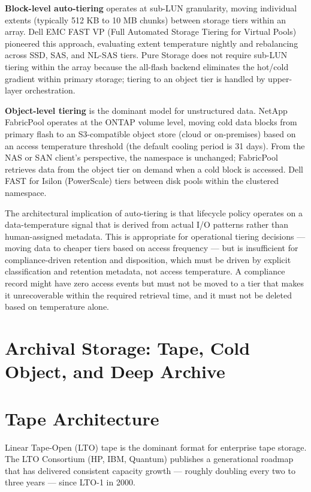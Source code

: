 \textbf{Block-level auto-tiering} operates at sub-LUN granularity, moving individual extents (typically 512 KB to 10 MB chunks) between storage tiers within an array. Dell EMC FAST VP (Full Automated Storage Tiering for Virtual Pools) pioneered this approach, evaluating extent temperature nightly and rebalancing across SSD, SAS, and NL-SAS tiers. Pure Storage does not require sub-LUN tiering within the array because the all-flash backend eliminates the hot/cold gradient within primary storage; tiering to an object tier is handled by upper-layer orchestration.

\textbf{Object-level tiering} is the dominant model for unstructured data. NetApp FabricPool operates at the ONTAP volume level, moving cold data blocks from primary flash to an S3-compatible object store (cloud or on-premises) based on an access temperature threshold (the default cooling period is 31 days). From the NAS or SAN client's perspective, the namespace is unchanged; FabricPool retrieves data from the object tier on demand when a cold block is accessed. Dell FAST for Isilon (PowerScale) tiers between disk pools within the clustered namespace.

The architectural implication of auto-tiering is that lifecycle policy operates on a data-temperature signal that is derived from actual I/O patterns rather than human-assigned metadata. This is appropriate for operational tiering decisions --- moving data to cheaper tiers based on access frequency --- but is insufficient for compliance-driven retention and disposition, which must be driven by explicit classification and retention metadata, not access temperature. A compliance record might have zero access events but must not be moved to a tier that makes it unrecoverable within the required retrieval time, and it must not be deleted based on temperature alone.

\section{Archival Storage: Tape, Cold Object, and Deep Archive}
\section{Tape Architecture}
Linear Tape-Open (LTO) tape is the dominant format for enterprise tape storage. The LTO Consortium (HP, IBM, Quantum) publishes a generational roadmap that has delivered consistent capacity growth --- roughly doubling every two to three years --- since LTO-1 in 2000.


